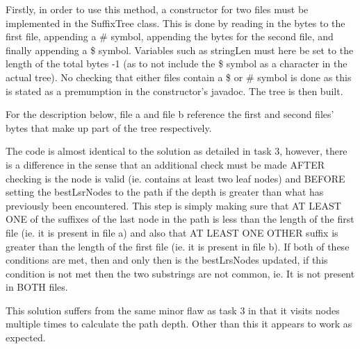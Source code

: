 \documentclass[12pt]{article} %
\begin{document}
Firstly, in order to use this method, a constructor for two files must be implemented in the
SuffixTree class. This is done by reading in the bytes to the first file, appending a \# symbol,
appending the bytes for the second file, and finally appending a \$ symbol. Variables such as
stringLen must here be set to the length of the total bytes -1 (as to not include the \$ symbol as a
character in the actual tree). No checking that either files contain a \$ or \# symbol is done as this is stated as a premumption in the constructor's javadoc. The tree is then built.

For the description below, file a and file b reference the first and second files' bytes that make
up part of the tree respectively.

The code is almost identical to the solution as detailed in task 3, however, there is a difference
in the sense that an additional check must be made AFTER checking is the node is valid (ie.
contains at least two leaf nodes) and BEFORE setting the bestLsrNodes to the path if the depth is
greater than what has previously been encountered. This step is simply making sure that AT LEAST
ONE of the suffixes of the last node in the path is less than the length of the first file (ie. it
is present in file a) and also that AT LEAST ONE OTHER suffix is greater than the length of the
first file (ie. it is present in file b). If both of these conditions are met, then and only
then is the bestLrsNodes updated, if this condition is not met then the two substrings are not
common, ie. It is not present in BOTH files. 

This solution suffers from the same minor flaw as task 3 in that it visits nodes multiple times to
calculate the path depth. Other than this it appears to work as expected.
\newpage
\end{document}
